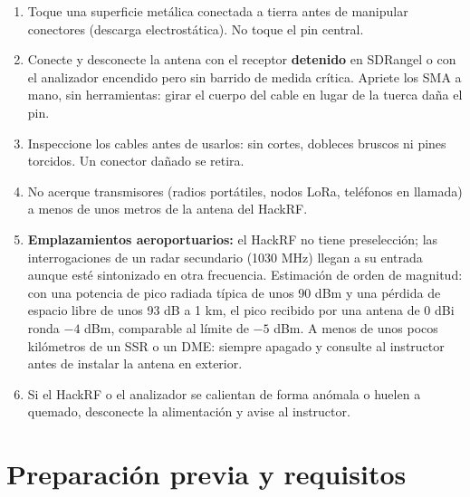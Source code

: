 \begin{alerta}
\begin{enumerate}
  \item Toque una superficie metálica conectada a tierra antes de manipular conectores (descarga electrostática). No toque el pin central.
  \item Conecte y desconecte la antena con el receptor \textbf{detenido} en SDRangel o con el analizador encendido pero sin barrido de medida crítica. Apriete los SMA a mano, sin herramientas: girar el cuerpo del cable en lugar de la tuerca daña el pin.
  \item Inspeccione los cables antes de usarlos: sin cortes, dobleces bruscos ni pines torcidos. Un conector dañado se retira.
  \item No acerque transmisores (radios portátiles, nodos LoRa, teléfonos en llamada) a menos de unos metros de la antena del HackRF.
  \item \textbf{Emplazamientos aeroportuarios:} el HackRF no tiene preselección; las interrogaciones de un radar secundario (1030 MHz) llegan a su entrada aunque esté sintonizado en otra frecuencia. Estimación de orden de magnitud: con una potencia de pico radiada típica de unos 90 dBm y una pérdida de espacio libre de unos 93 dB a 1 km, el pico recibido por una antena de 0 dBi ronda $-4$ dBm, comparable al límite de $-5$ dBm. A menos de unos pocos kilómetros de un SSR o un DME:  siempre apagado y consulte al instructor antes de instalar la antena en exterior.
  \item Si el HackRF o el analizador se calientan de forma anómala o huelen a quemado, desconecte la alimentación y avise al instructor.
\end{enumerate}
\end{alerta}

\section{Preparación previa y requisitos}
\label{sec:prerrequisitos}

